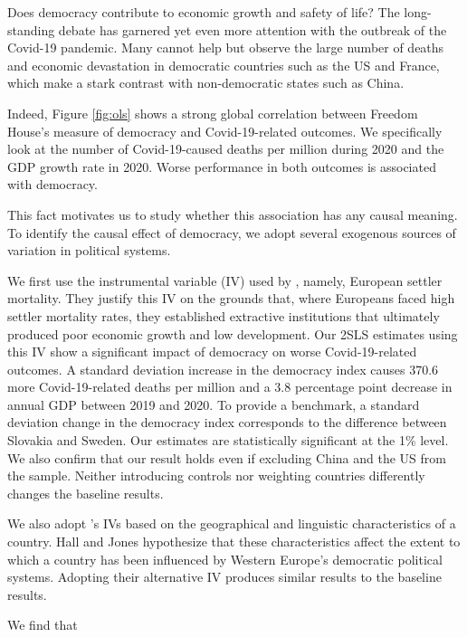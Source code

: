 
Does democracy contribute to economic growth and safety of life? The long-standing debate has garnered yet even more attention with the outbreak of the Covid-19 pandemic. Many cannot help but observe the large number of deaths and economic devastation in democratic countries such as the US and France, which make a stark contrast with non-democratic states such as China.

Indeed, Figure \ref{fig:ols} shows a strong global correlation between Freedom House's measure of democracy and Covid-19-related outcomes. We specifically look at the number of Covid-19-caused deaths per million during 2020 and the GDP growth rate in 2020. Worse performance in both outcomes is associated with democracy. 

This fact motivates us to study whether this association has any causal meaning. To identify the causal effect of democracy, we adopt several exogenous sources of variation in political systems. 


We first use the instrumental variable (IV) used by \citet{ajr}, namely, European settler mortality. They justify this IV on the grounds that, where Europeans faced high settler mortality rates, they established extractive institutions that ultimately produced poor economic growth and low development. Our 2SLS estimates using this IV show a significant impact of democracy on worse Covid-19-related outcomes. A standard deviation increase in the democracy index causes 370.6 more Covid-19-related deaths per million and a 3.8 percentage point decrease in annual GDP between 2019 and 2020. To provide a benchmark, a standard deviation change in the democracy index corresponds to the difference between Slovakia and Sweden. Our estimates are statistically significant at the 1\% level. We also confirm that our result holds even if excluding China and the US from the sample. Neither introducing controls nor weighting countries differently changes the baseline results. 

We also adopt \citet{hj}'s IVs based on the geographical and linguistic characteristics of a country. Hall and Jones hypothesize that these characteristics affect the extent to which a country has been influenced by Western Europe's democratic political systems. Adopting their alternative IV produces similar results to the baseline results.



We find that 

